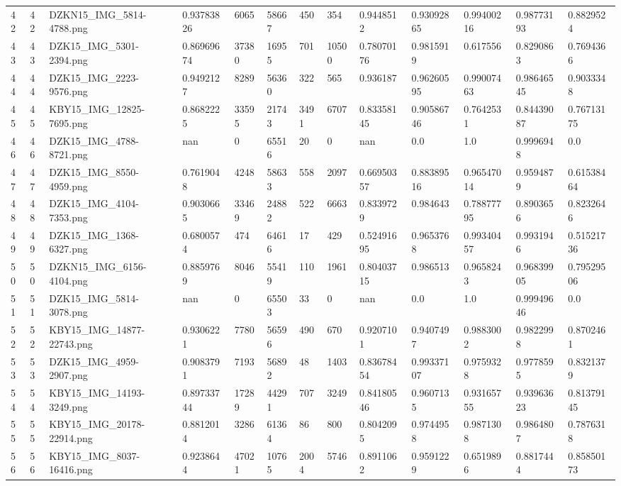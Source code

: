 \documentclass[11pt, a4paper, twoside]{report}
\begin{document}
\begin{longtable}[c]{@{}lllllllllllll@{}}
42 & 42 & DZKN15\_IMG\_5814-4788.png & 0.93783826 & 6065 & 58667 & 450 & 354 & 0.9448512 & 0.93092865 & 0.99400216 & 0.98773193 & 0.8829524 \\
43 & 43 & DZK15\_IMG\_5301-2394.png & 0.86969674 & 37380 & 16955 & 701 & 10500 & 0.78070176 & 0.9815919 & 0.617556 & 0.8290863 & 0.7694366 \\
44 & 44 & DZK15\_IMG\_2223-9576.png & 0.9492127 & 8289 & 56360 & 322 & 565 & 0.936187 & 0.96260595 & 0.99007463 & 0.98646545 & 0.9033348 \\
45 & 45 & KBY15\_IMG\_12825-7695.png & 0.8682225 & 33595 & 21743 & 3491 & 6707 & 0.83358145 & 0.90586746 & 0.7642531 & 0.84439087 & 0.76713175 \\
46 & 46 & DZK15\_IMG\_4788-8721.png & nan & 0 & 65516 & 20 & 0 & nan & 0.0 & 1.0 & 0.9996948 & 0.0 \\
47 & 47 & DZK15\_IMG\_8550-4959.png & 0.7619048 & 4248 & 58633 & 558 & 2097 & 0.66950357 & 0.88389516 & 0.96547014 & 0.9594879 & 0.61538464 \\
48 & 48 & DZK15\_IMG\_4104-7353.png & 0.9030665 & 33469 & 24882 & 522 & 6663 & 0.8339729 & 0.984643 & 0.78877795 & 0.8903656 & 0.8232646 \\
49 & 49 & DZK15\_IMG\_1368-6327.png & 0.6800574 & 474 & 64616 & 17 & 429 & 0.52491695 & 0.9653768 & 0.99340457 & 0.9931946 & 0.51521736 \\
50 & 50 & DZKN15\_IMG\_6156-4104.png & 0.8859769 & 8046 & 55419 & 110 & 1961 & 0.80403715 & 0.986513 & 0.9658243 & 0.96839905 & 0.79529506 \\
51 & 51 & DZK15\_IMG\_5814-3078.png & nan & 0 & 65503 & 33 & 0 & nan & 0.0 & 1.0 & 0.99949646 & 0.0 \\
52 & 52 & KBY15\_IMG\_14877-22743.png & 0.9306221 & 7780 & 56596 & 490 & 670 & 0.9207101 & 0.9407497 & 0.9883002 & 0.9822998 & 0.8702461 \\
53 & 53 & DZK15\_IMG\_4959-2907.png & 0.9083791 & 7193 & 56892 & 48 & 1403 & 0.83678454 & 0.99337107 & 0.9759328 & 0.9778595 & 0.8321379 \\
54 & 54 & KBY15\_IMG\_14193-3249.png & 0.89733744 & 17289 & 44291 & 707 & 3249 & 0.84180546 & 0.9607135 & 0.93165755 & 0.93963623 & 0.81379145 \\
55 & 55 & KBY15\_IMG\_20178-22914.png & 0.8812014 & 3286 & 61364 & 86 & 800 & 0.8042095 & 0.9744958 & 0.9871308 & 0.9864807 & 0.7876318 \\
56 & 56 & KBY15\_IMG\_8037-16416.png & 0.9238644 & 47021 & 10765 & 2004 & 5746 & 0.8911062 & 0.9591229 & 0.6519896 & 0.8817444 & 0.85850173 \\

\end{longtable}
\end{document}
